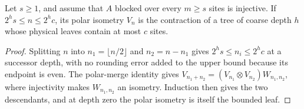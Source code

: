 \begin{lemma}
    \label{thm:ldp_unequal_polar_tree}
    \leanok
    Let $s\ge1$, and assume that $A$ blocked over every $m\ge s$ sites
    is injective. If $2^h s\le n\le2^h c$, its polar isometry $V_n$
    is the contraction of a tree of coarse depth $h$ whose physical
    leaves contain at most $c$ sites.
\end{lemma}
\begin{proof}
    \leanok
    Splitting $n$ into $n_1=\lfloor n/2\rfloor$ and $n_2=n-n_1$ gives
    $2^h s\le n_i\le2^h c$ at a successor depth, with no rounding error
    added to the upper bound because its endpoint is even. The polar-merge
    identity gives $V_{n_1+n_2}=(V_{n_1}\otimes V_{n_2})W_{n_1,n_2}$,
    where injectivity makes $W_{n_1,n_2}$ an isometry. Induction then
    gives the two descendants, and at depth zero the polar isometry is
    itself the bounded leaf.
\end{proof}

